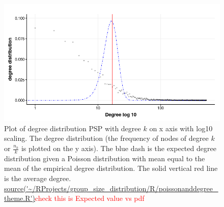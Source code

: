 
\begin{figure}
    \centering
    \includegraphics[width=\textwidth]{images/chapter3/ggplot2/theme/powerlaw/Rplot01_poissonanddegree2.png}
    \caption[Degree distribution with Poisson pdf overlaid]{Plot of degree distribution PSP with degree $k$ on x axis with log10 scaling. The degree distribution (the frequency of nodes of degree $k$ or $\frac{n_k}{k}$ is plotted on the y axis). The blue dash is the expected degree distribution given a Poisson distribution with mean equal to the mean of the empirical degree distribution. The solid vertical red line is the average degree. \url{source('~/RProjects/group_size_distribution/R/poissonanddegree_theme.R')}\textcolor{red}{check this is Expected value vs pdf}}
    \label{fig:PSP degree power-law poisson}
\end{figure}
 

